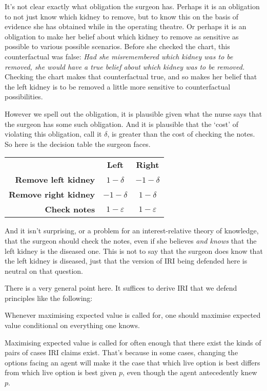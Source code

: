 \documentclass[oneside]{book}
\begin{document}
It's not clear exactly what obligation the surgeon has. Perhaps it is an obligation to not just know which kidney to remove, but to know this on the basis of evidence she has obtained while in the operating theatre. Or perhaps it is an obligation to make her belief about which kidney to remove as sensitive as possible to various possible scenarios. Before she checked the chart, this counterfactual was false: \textit{Had she misremembered which kidney was to be removed, she would have a true belief about which kidney was to be removed.} Checking the chart makes that counterfactual true, and so makes her belief that the left kidney is to be removed a little more sensitive to counterfactual possibilities. 

However we spell out the obligation, it is plausible given what the nurse says that the surgeon has some such obligation. And it is plausible that the `cost' of violating this obligation, call it $\delta$, is greater than the cost of checking the notes. So here is the decision table the surgeon faces.

\begin{center}
\begin{tabular}{r c c}
 & \textbf{Left} & \textbf{Right} \\
\textbf{Remove left kidney} & $1-\delta$ & $-1-\delta$ \\
\textbf{Remove right kidney} & $-1-\delta$ & $1-\delta$ \\
\textbf{Check notes} & $1-\varepsilon$ & $1-\varepsilon$ \\
\end{tabular}
\end{center}

\noindent And it isn't surprising, or a problem for an interest-relative theory of knowledge, that the surgeon should check the notes, even if she believes \textit{and knows} that the left kidney is the diseased one. This is not to say that the surgeon does know that the left kidney is diseased, just that the version of IRI being defended here is neutral on that question.

There is a very general point here. It suffices to derive IRI that we defend principles like the following:

\begin{itemize*}
\item Whenever maximising expected value is called for, one should maximise expected value conditional on everything one knows.
\item Maximising expected value is called for often enough that there exist the kinds of pairs of cases IRI claims exist. That's because in some cases, changing the options facing an agent will make it the case that which live option is best differs from which live option is best given $p$, even though the agent antecedently knew $p$.
\end{itemize*}
\end{document}
